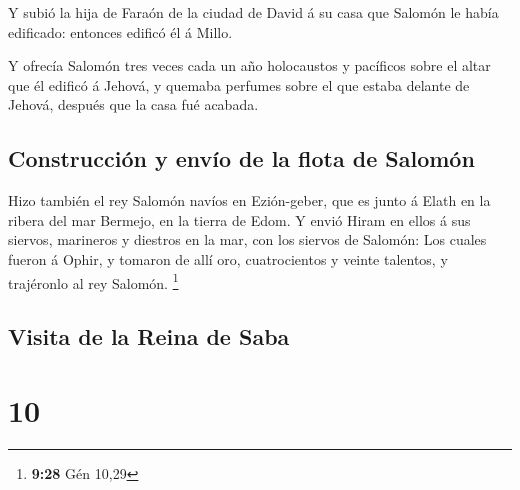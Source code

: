  Y subió la hija de Faraón de la ciudad de David á su
casa que Salomón le había edificado: entonces edificó él á Millo.

 Y ofrecía Salomón tres veces cada un año holocaustos y
pacíficos sobre el altar que él edificó á Jehová, y quemaba perfumes
sobre el que estaba delante de Jehová, después que la casa fué acabada.

\hypertarget{construcciuxf3n-y-envuxedo-de-la-flota-de-salomuxf3n}{%
\subsection{Construcción y envío de la flota de
Salomón}\label{construcciuxf3n-y-envuxedo-de-la-flota-de-salomuxf3n}}

 Hizo también el rey Salomón navíos en Ezión-geber, que
es junto á Elath en la ribera del mar Bermejo, en la tierra de Edom.
 Y envió Hiram en ellos á sus siervos, marineros y
diestros en la mar, con los siervos de Salomón:  Los
cuales fueron á Ophir, y tomaron de allí oro, cuatrocientos y veinte
talentos, y trajéronlo al rey Salomón. \footnote{\textbf{9:28} Gén 10,29}

\hypertarget{visita-de-la-reina-de-saba}{%
\subsection{Visita de la Reina de
Saba}\label{visita-de-la-reina-de-saba}}

\hypertarget{section-9}{%
\section{10}\label{section-9}}

